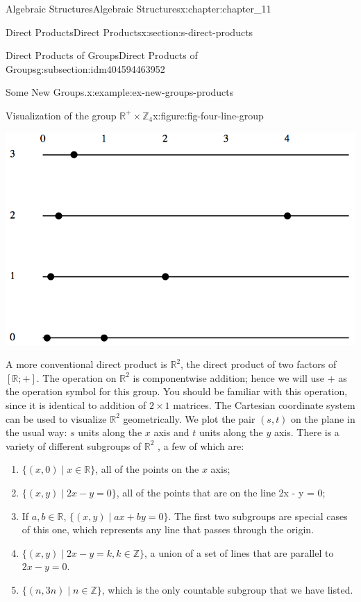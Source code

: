 \documentclass[twoside,10pt,]{book}
\numberwithin{equation}{section}
\begin{document}
\begin{chapterptx}{Algebraic Structures}{}{Algebraic Structures}{}{}{x:chapter:chapter_11}
\begin{sectionptx}{Direct Products}{}{Direct Products}{}{}{x:section:s-direct-products}
\begin{subsectionptx}{Direct Products of Groups}{}{Direct Products of Groups}{}{}{g:subsection:idm404594463952}
\begin{example}{Some New Groups.}{x:example:ex-new-groups-products}
\begin{figureptx}{Visualization of the group \(\mathbb{R}^+ \times  \mathbb{Z}_4\)}{x:figure:fig-four-line-group}{}
\begin{image}{0.15}{0.7}{0.15}%
\includegraphics[width=\linewidth]{images/fig-four-line-group.png}
\end{image}%
\tcblower
\end{figureptx}%
\end{example}
A more conventional direct product is \(\mathbb{R}^2\), the direct product of two factors of \([\mathbb{R}; + ]\). The operation on \(\mathbb{R}^2\) is componentwise addition; hence we will use + as the operation symbol for this group. You should be familiar with this operation, since it is identical to addition of \(2 \times  1\) matrices. The Cartesian coordinate system can be used to visualize \(\mathbb{R}^2\) geometrically. We plot the pair \((s, t)\) on the plane in the usual way: \(s\) units along the \(x\) axis and \(t\) units along the \(y\) axis. There is a variety of different subgroups of \(\mathbb{R}^2\) , a few of which are:%
\begin{enumerate}[label=(\alph*)]
\item{}\(\{(x, 0) \mid x \in  \mathbb{R}\}\), all of the points on the \(x\) axis;%
\item{}\(\{(x, y) \mid 2x- y = 0\}\), all of the points that are on the line 2x - y = 0;%
\item{}If \(a, b \in  \mathbb{R}\), \(\{(x, y) \mid a x + b y = 0\}\).  The first two subgroups are special cases of this one, which represents any line that passes through the origin.%
\item{}\(\{(x, y) \mid 2x - y = k, k \in  \mathbb{Z}\}\), a union of a set of lines that are parallel to \(2x - y = 0\).%
\item{}\(\{(n, 3n) \mid n \in  \mathbb{Z}\}\), which is the only countable subgroup that we have listed.%
\end{enumerate}

\end{subsectionptx}
\end{sectionptx}
\end{chapterptx}
\end{document}
